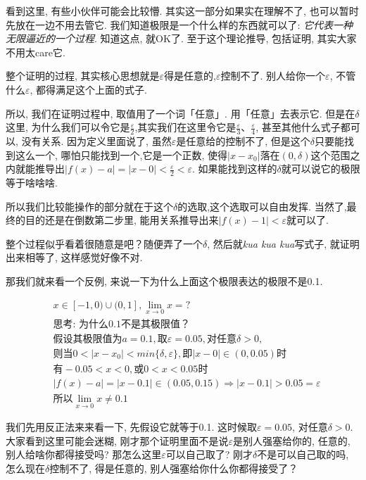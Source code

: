 看到这里, 有些小伙伴可能会比较懵. 其实这一部分如果实在理解不了, 也可以暂时先放在一边不用去管它. 我们知道极限是一个什么样的东西就可以了: \textit{它代表一种无限逼近的一个过程}. 知道这点, 就OK了. 至于这个理论推导, 包括证明, 其实大家不用太care它. 

整个证明的过程, 其实核心思想就是$\varepsilon$得是任意的,$\varepsilon$控制不了.  别人给你一个$\varepsilon$, 不管什么$\varepsilon$, 都得满足这个上面的式子. 

所以, 我们在证明过程中, 取值用了一个词「任意」.  用「任意」去表示它. 但是在$\delta$这里, 为什么我们可以令它是$\frac{\varepsilon}{2}$,其实我们在这里令它是$\frac{\varepsilon}{3}$、$\frac{\varepsilon}{4}$, 甚至其他什么式子都可以, 没有关系. 因为定义里面说了, 虽然$\varepsilon$是任意给的控制不了, 但是这个$\delta$只要能找到这么一个, 哪怕只能找到一个,它是一个正数, 使得$|x-x_0|$落在$(0,\delta)$这个范围之内就能推导出$|f(x) - a| = |x - 0| < \frac{\varepsilon}{2} < \varepsilon$. 如果能找到这样的$\delta$就可以说它的极限等于啥啥啥. 

所以我们比较能操作的部分就在于这个$\delta$的选取,这个选取可以自由发挥. 当然了,最终的目的还是在倒数第二步里, 能用关系推导出来$|f(x)-1| < \varepsilon$就可以了. 

整个过程似乎看着很随意是吧？随便弄了一个$\delta$, 然后就\textit{kua kua kua}写式子, 就证明出来相等了, 这样感觉好像不对. 

那我们就来看一个反例, 来说一下为什么上面这个极限表达的极限不是0.1. 

\begin{align*}
  & x \in [-1,0) \cup (0, 1], \lim_{x \to 0} x = ? \\
  & \mbox{思考:  为什么0.1不是其极限值？}\\
  & \mbox{假设其极限值为}a = 0.1, \mbox{取} \varepsilon = 0.05, \mbox{对任意}\delta > 0, \\
  & \mbox{则当} 0< |x-x_0| < min\{\delta, \varepsilon \}, \mbox{即}|x-0| \in (0, 0.05)\mbox{时} \\
  & \mbox{有}-0.05 < x < 0, \mbox{或} 0 < x < 0.05 \mbox{时} \\
  & |f(x)-a| = |x-0.1| \in (0.05, 0.15) \Rightarrow |x-0.1| > 0.05 = \varepsilon \\
  & \mbox{所以} \lim_{x \to 0} x \ne 0.1
\end{align*}

我们先用反正法来来看一下, 先假设它就等于0.1. 这时候取$\varepsilon = 0.05$, 对任意$\delta > 0$. 大家看到这里可能会迷糊, 刚才那个证明里面不是说$\varepsilon$是别人强塞给你的, 任意的, 别人给啥你都得接受吗? 那怎么这里$\varepsilon$可以自己取了? 刚才$\delta$不是可以自己取的吗, 怎么现在$\delta$控制不了, 得是任意的, 别人强塞给你什么你都得接受了？


